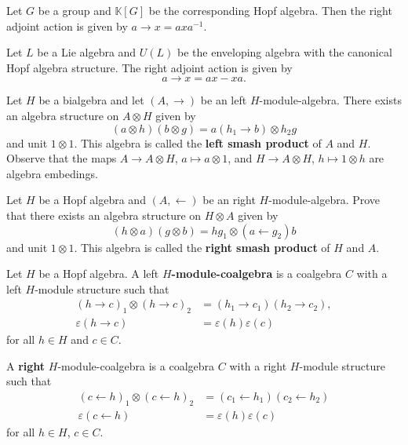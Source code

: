 Let $G$ be a group and $\mathbb{K}[G]$ be the corresponding Hopf algebra. Then
the right adjoint action is given by $a\rightarrow x=axa^{-1}$.

\begin{example}
Let $L$ be a Lie algebra and $U(L)$ be the enveloping algebra with
the canonical Hopf algebra structure. The right adjoint action
is given by \[
a\rightarrow x=ax-xa.
\]
\end{example}

\begin{exercise}
\label{exercise:left_smash}
Let $H$ be a bialgebra and let $(A,\rightarrow)$ be an left $H$-module-algebra.
There exists an algebra structure on $A\otimes H$ given by
\[
(a\otimes h)(b\otimes g)=a(h_{1}\rightarrow b)\otimes h_{2}g
\]
and unit $1\otimes1$. This algebra is called the \textbf{left smash product}
of $A$ and $H$.  Observe that the maps $A\to A\otimes H$, $a\mapsto a\otimes1$,
and $H\to A\otimes H$, $h\mapsto 1\otimes h$ are algebra embedings.
\end{exercise}

\begin{exercise}
Let $H$ be a Hopf algebra and $(A,\leftarrow)$ be an right $H$-module-algebra.
Prove that there exists an algebra structure on $H\otimes A$ given by 
\[
(h\otimes a)(g\otimes b)=hg_{1}\otimes(a\leftarrow g_{2})b
\]
and unit $1\otimes1$. This algebra is called the \textbf{right
smash product} of $H$ and $A$. 
\end{exercise}


\begin{definition}
\label{def:module_coalgebra}
Let $H$ be a Hopf algebra. A left \textbf{$H$-module-coalgebra}
is a coalgebra $C$ with a left $H$-module structure such that 
\begin{align*}
(h\rightarrow c)_{1}\otimes(h\rightarrow c)_{2} & =(h_{1}\rightarrow c_{1})(h_{2}\rightarrow c_{2}),\\
\varepsilon(h\rightarrow c) & =\varepsilon(h)\varepsilon(c)
\end{align*}
for all $h\in H$ and $c\in C$. 
\end{definition}

A \textbf{right} $H$-module-coalgebra is a coalgebra $C$ with a right
$H$-module structure such that 
\begin{align*}
(c\leftarrow h)_{1}\otimes(c\leftarrow h)_{2} & =(c_{1}\leftarrow h_{1})(c_{2}\leftarrow h_{2})\\
\varepsilon(c\leftarrow h) & =\varepsilon(h)\varepsilon(c)
\end{align*}
for all $h\in H$, $c\in C$.

